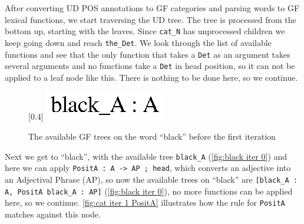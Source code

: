 

After converting \ac{UD} \ac{POS} annotations to \ac{GF} categories and parsing words to \ac{GF} lexical functions, we start traversing the \ac{UD} tree. The tree is processed from the bottom up, starting with the leaves. Since \lstinline{cat_N} has unprocessed children we keep going down and reach \lstinline{the_Det}. We look through the list of available functions and see that the only function that takes a \lstinline{Det} as an argument takes several arguments and no functions take a \texttt{Det} in head position, so it can not be applied to a leaf node like this. There is nothing to be done here, so we continue.

\begin{figure}[H]
    \centering
    [0.4\textwidth]
        {\includegraphics[scale=0.75]{figure/black_cats/black_A_gf.eps}}
    \caption{The available GF trees on the word ``black'' before the first iteration}\label{fig:black iter 0}
\end{figure}

Next we get to ``black'', with the available tree \lstinline|black_A| (\autoref{fig:black iter 0}) and here we can apply \lstinline|PositA : A -> AP ; head|, which converts an adjective into an Adjectival Phrase (AP), so now the available trees on ``black'' are
\lstinline|[black_A : A, PositA black_A : AP]| (\autoref{fig:black iter 0}), no more functions can be applied here, so we continue. \autoref{fig:cat iter 1 PositA} illustrates how the rule for \texttt{PositA} matches against this node.

